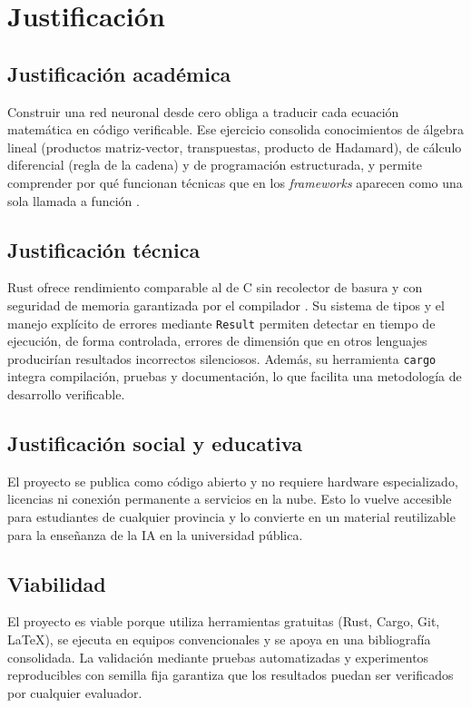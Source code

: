 \section{Justificación}
\subsection{Justificación académica}
Construir una red neuronal desde cero obliga a traducir cada ecuación matemática en código verificable. Ese ejercicio consolida conocimientos de álgebra lineal (productos matriz-vector, transpuestas, producto de Hadamard), de cálculo diferencial (regla de la cadena) y de programación estructurada, y permite comprender por qué funcionan técnicas que en los \emph{frameworks} aparecen como una sola llamada a función \citep{nielsen2015,deisenroth2020}.

\subsection{Justificación técnica}
Rust ofrece rendimiento comparable al de C sin recolector de basura y con seguridad de memoria garantizada por el compilador \citep{klabnik2023,jung2018}. Su sistema de tipos y el manejo explícito de errores mediante \texttt{Result} permiten detectar en tiempo de ejecución, de forma controlada, errores de dimensión que en otros lenguajes producirían resultados incorrectos silenciosos. Además, su herramienta \texttt{cargo} integra compilación, pruebas y documentación, lo que facilita una metodología de desarrollo verificable.

\subsection{Justificación social y educativa}
El proyecto se publica como código abierto y no requiere hardware especializado, licencias ni conexión permanente a servicios en la nube. Esto lo vuelve accesible para estudiantes de cualquier provincia y lo convierte en un material reutilizable para la enseñanza de la IA en la universidad pública.

\subsection{Viabilidad}
El proyecto es viable porque utiliza herramientas gratuitas (Rust, Cargo, Git, \LaTeX), se ejecuta en equipos convencionales y se apoya en una bibliografía consolidada. La validación mediante pruebas automatizadas y experimentos reproducibles con semilla fija garantiza que los resultados puedan ser verificados por cualquier evaluador.
